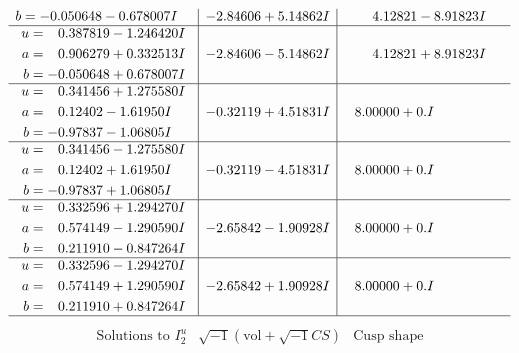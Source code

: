 \documentclass[1p]{elsarticle_modified}
\theoremstyle{definition}
\newcommand{\I}{\sqrt{-1}}
\begin{document}
$$\begin{array}{c|c|c}
\begin{aligned}
b &= -0.050648 - 0.678007 I\end{aligned}
 & -2.84606 + 5.14862 I & \phantom{-}4.12821 - 8.91823 I \\ \hline\begin{aligned}
u &= \phantom{-}0.387819 - 1.246420 I \\
a &= \phantom{-}0.906279 + 0.332513 I \\
b &= -0.050648 + 0.678007 I\end{aligned}
 & -2.84606 - 5.14862 I & \phantom{-}4.12821 + 8.91823 I \\ \hline\begin{aligned}
u &= \phantom{-}0.341456 + 1.275580 I \\
a &= \phantom{-}0.12402 - 1.61950 I \\
b &= -0.97837 - 1.06805 I\end{aligned}
 & -0.32119 + 4.51831 I & \phantom{-}8.00000 + 0. I\phantom{ +0.000000I} \\ \hline\begin{aligned}
u &= \phantom{-}0.341456 - 1.275580 I \\
a &= \phantom{-}0.12402 + 1.61950 I \\
b &= -0.97837 + 1.06805 I\end{aligned}
 & -0.32119 - 4.51831 I & \phantom{-}8.00000 + 0. I\phantom{ +0.000000I} \\ \hline\begin{aligned}
u &= \phantom{-}0.332596 + 1.294270 I \\
a &= \phantom{-}0.574149 - 1.290590 I \\
b &= \phantom{-}0.211910 - 0.847264 I\end{aligned}
 & -2.65842 - 1.90928 I & \phantom{-}8.00000 + 0. I\phantom{ +0.000000I} \\ \hline\begin{aligned}
u &= \phantom{-}0.332596 - 1.294270 I \\
a &= \phantom{-}0.574149 + 1.290590 I \\
b &= \phantom{-}0.211910 + 0.847264 I\end{aligned}
 & -2.65842 + 1.90928 I & \phantom{-}8.00000 + 0. I\phantom{ +0.000000I}\\
 \hline 
 \end{array}$$\newpage$$\begin{array}{c|c|c}  
\text{Solutions to }I^u_{2}& \I (\text{vol} + \sqrt{-1}CS) & \text{Cusp shape}\\
 \hline 
\begin{aligned}

\end{aligned}
\end{array}$$
\end{document}
